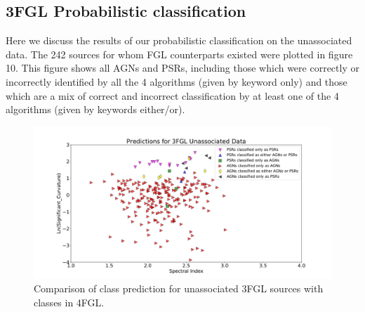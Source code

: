 



\subsection{3FGL Probabilistic classification} 

Here we discuss the results of our probabilistic classification on the unassociated data. The 242 sources for whom FGL counterparts existed were plotted in figure 10. This figure shows all AGNs and PSRs, including those which were correctly or incorrectly identified by all the 4 algorithms (given by keyword only) and those which are a mix of correct and incorrect classification by at least one of the 4 algorithms (given by keywords either/or). 
\begin{figure}[h]
\centering
\includegraphics[width=\textwidth]{plots/plot_final.pdf}
\caption{Comparison of class prediction for unassociated 3FGL sources with classes in 4FGL. }
\label{fig:Maps_data}
\end{figure}


